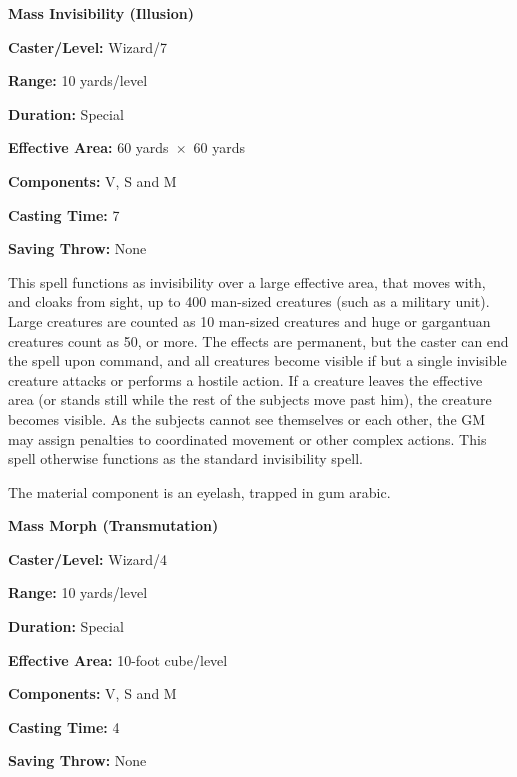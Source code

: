 \begin{multicols}{2}
\begin{minipage}{\columnwidth}
\noindent \textbf{Mass Invisibility (Illusion)}

\noindent \textbf{Caster/Level:} Wizard/7

\noindent \textbf{Range:} 10 yards/level

\noindent \textbf{Duration:} Special

\noindent \textbf{Effective Area:} 60 yards~$\times$~60 yards

\noindent \textbf{Components:} V, S and M

\noindent \textbf{Casting Time:} 7

\noindent \textbf{Saving Throw:} None

\end{minipage}

This spell functions as invisibility over a large effective area, that moves with, and cloaks from sight, up to 400 man-sized creatures (such as a military unit).  Large creatures are counted as 10 man-sized creatures and huge or gargantuan creatures count as 50, or more.  The effects are permanent, but the caster can end the spell upon command, and all creatures become visible if but a single invisible creature attacks or performs a hostile action.  If a creature leaves the effective area (or stands still while the rest of the subjects move past him), the creature becomes visible.  As the subjects cannot see themselves or each other, the GM may assign penalties to coordinated movement or other complex actions.  This spell otherwise functions as the standard invisibility spell.
 
The material component is an eyelash, trapped in gum arabic.

\vspace{1em}

\noindent
\begin{minipage}{\columnwidth}

\noindent \textbf{Mass Morph (Transmutation)}

\noindent \textbf{Caster/Level:} Wizard/4

\noindent \textbf{Range:} 10 yards/level

\noindent \textbf{Duration:} Special

\noindent \textbf{Effective Area:} 10-foot cube/level

\noindent \textbf{Components:} V, S and M

\noindent \textbf{Casting Time:} 4

\noindent \textbf{Saving Throw:} None

\end{minipage}


\end{multicols}
